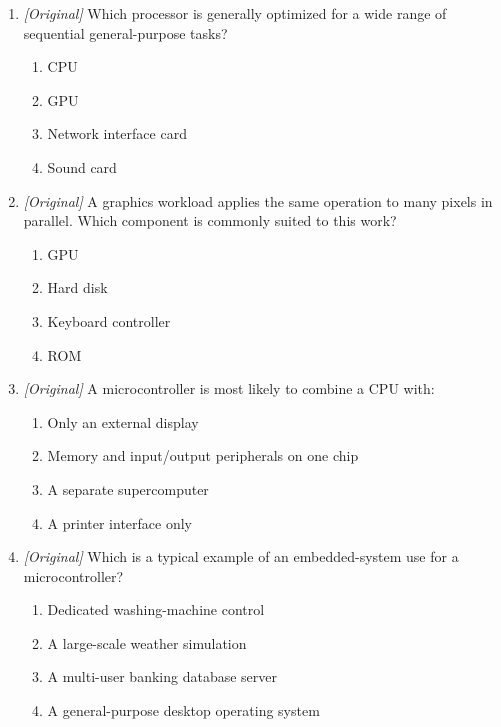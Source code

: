 \begin{enumerate}[label=\textbf{Q\arabic*.}, leftmargin=*]
\begin{enumerate}[label=\Alph*.]
    \item Processor clock speed is measured in hertz.
    \item RAM chips sit inside the microprocessor package by definition.
  \end{enumerate}
\item \textit{[Original]} Which processor is generally optimized for a wide range of sequential general-purpose tasks?
  \begin{enumerate}[label=\Alph*.]
\item CPU
   \item GPU
   \item Network interface card
   \item Sound card
  \end{enumerate}

\item \textit{[Original]} A graphics workload applies the same operation to many pixels in parallel. Which component is commonly suited to this work?
  \begin{enumerate}[label=\Alph*.]
\item GPU
   \item Hard disk
   \item Keyboard controller
   \item ROM
  \end{enumerate}

\item \textit{[Original]} A microcontroller is most likely to combine a CPU with:
  \begin{enumerate}[label=\Alph*.]
\item Only an external display
   \item Memory and input/output peripherals on one chip
   \item A separate supercomputer
   \item A printer interface only
  \end{enumerate}

\item \textit{[Original]} Which is a typical example of an embedded-system use for a microcontroller?
  \begin{enumerate}[label=\Alph*.]
\item Dedicated washing-machine control
   \item A large-scale weather simulation
   \item A multi-user banking database server
   \item A general-purpose desktop operating system
  \end{enumerate}


\end{enumerate}
